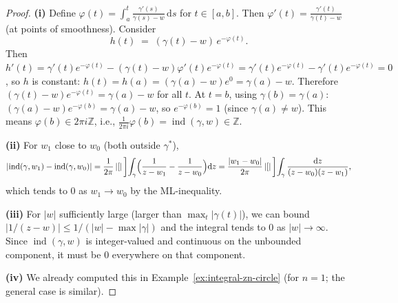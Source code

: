 \documentclass[12pt,a4paper,openany]{book}
\theoremstyle{definition}
\theoremstyle{plain}
\theoremstyle{remark}
\newcommand{\Z}{\mathbb{Z}}
\DeclareMathOperator{\ind}{ind}
\newcommand{\dd}{\mathrm{d}}
\newcommand{\abs}[1]{\left|#1\right|}
\begin{document}
\begin{proof}
\textbf{(i)} Define $\varphi(t) = \int_a^t\frac{\gamma'(s)}{\gamma(s)-w}\,\dd s$
for $t\in[a,b]$.  Then $\varphi'(t) = \frac{\gamma'(t)}{\gamma(t)-w}$
(at points of smoothness).  Consider
\[
  h(t) \;=\; (\gamma(t)-w)\,e^{-\varphi(t)}.
\]
Then $h'(t) = \gamma'(t)e^{-\varphi(t)} - (\gamma(t)-w)\varphi'(t)e^{-\varphi(t)}
= \gamma'(t)e^{-\varphi(t)} - \gamma'(t)e^{-\varphi(t)} = 0$,
so $h$ is constant: $h(t)=h(a)=(\gamma(a)-w)e^{0}=\gamma(a)-w$.
Therefore $(\gamma(t)-w)e^{-\varphi(t)}=\gamma(a)-w$ for all $t$.
At $t=b$, using $\gamma(b)=\gamma(a)$:
$(\gamma(a)-w)e^{-\varphi(b)} = \gamma(a)-w$, so $e^{-\varphi(b)}=1$
(since $\gamma(a)\ne w$).  This means $\varphi(b)\in 2\pi i\Z$, i.e.,
$\frac{1}{2\pi i}\varphi(b) = \ind(\gamma,w)\in\Z$.

\textbf{(ii)} For $w_1$ close to $w_0$ (both outside $\gamma^*$),
\[
  \abs{\ind(\gamma,w_1)-\ind(\gamma,w_0)}
  = \frac{1}{2\pi}\abs[\bigg]{\int_\gamma\Bigl(\frac{1}{z-w_1}-\frac{1}{z-w_0}\Bigr)\dd z}
  = \frac{\abs{w_1-w_0}}{2\pi}\abs[\bigg]{\int_\gamma\frac{\dd z}{(z-w_0)(z-w_1)}},
\]
which tends to $0$ as $w_1\to w_0$ by the ML-inequality.

\textbf{(iii)} For $\abs{w}$ sufficiently large (larger than $\max_{t}\abs{\gamma(t)}$),
we can bound $\abs{1/(z-w)}\le 1/(\abs{w}-\max\abs{\gamma})$ and the integral
tends to $0$ as $\abs{w}\to\infty$.  Since $\ind(\gamma,w)$ is integer-valued
and continuous on the unbounded component, it must be $0$ everywhere on that
component.

\textbf{(iv)} We already computed this in Example~\ref{ex:integral-zn-circle}
(for $n=1$; the general case is similar).
\end{proof}

\begin{center}
\label{fig:winding-number}
\end{center}
\end{document}
